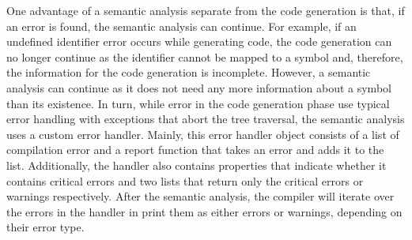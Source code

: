 One advantage of a semantic analysis separate from the code generation is that, if an error is found, the semantic analysis can continue. For example, if an undefined identifier error occurs while generating code, the code generation can no longer continue as the identifier cannot be mapped to a symbol and, therefore, the information for the code generation is incomplete. However, a semantic analysis can continue as it does not need any more information about a symbol than its existence. In turn, while error in the code generation phase use typical error handling with exceptions that abort the tree traversal, the semantic analysis uses a custom error handler. Mainly, this error handler object consists of a list of compilation error and a report function that takes an error and adds it to the list. Additionally, the handler also contains properties that indicate whether it contains critical errors and two lists that return only the critical errors or warnings respectively. After the semantic analysis, the compiler will iterate over the errors in the handler in print them as either errors or warnings, depending on their error type.
